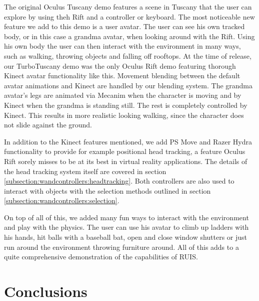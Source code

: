 \documentclass[12pt,a4paper,oneside,pdftex]{report}
\begin{document}
The original Oculus Tuscany demo features a scene in Tuscany that the user can explore by using theh Rift and a controller or keyboard. The most noticeable new feature we add to this demo is a user avatar. The user can see his own tracked body, or in this case a grandma avatar, when looking around with the Rift. Using his own body the user can then interact with the environment in many ways, such as walking, throwing objects and falling off rooftops. At the time of release, our TurboTuscany demo was the only Oculus Rift demo featuring thorough Kinect avatar functionality like this. Movement blending between the default avatar animations and Kinect are handled by our blending system. The grandma avatar's legs are animated via Mecanim when the character is moving and by Kinect when the grandma is standing still. The rest is completely controlled by Kinect. This results in more realistic looking walking, since the character does not slide against the ground.

In addition to the Kinect features mentioned, we add PS Move and Razer Hydra functionality to provide for example positional head tracking, a feature Oculus Rift sorely misses to be at its best in virtual reality applications. The details of the head tracking system itself are covered in section \ref{subsection:wandcontrollers:headtracking}. Both controllers are also used to interact with objects with the selection methods outlined in section \ref{subsection:wandcontrollers:selection}.

On top of all of this, we added many fun ways to interact with the environment and play with the physics. The user can use his avatar to climb up ladders with his hands, hit balls with a baseball bat, open and close window shutters or just run around the environment throwing furniture around. All of this adds to a quite comprehensive demonstration of the capabilities of RUIS.




\chapter{Conclusions}
\label{chapter:conclusions}


% 

\end{document}
